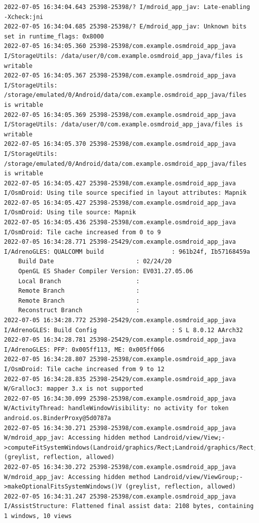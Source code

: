 \documentclass[a4paper,12pt]{book}
\begin{document}
\begin{lstlisting}
2022-07-05 16:34:04.643 25398-25398/? I/mdroid_app_jav: Late-enabling -Xcheck:jni
2022-07-05 16:34:04.685 25398-25398/? E/mdroid_app_jav: Unknown bits set in runtime_flags: 0x8000
2022-07-05 16:34:05.360 25398-25398/com.example.osmdroid_app_java I/StorageUtils: /data/user/0/com.example.osmdroid_app_java/files is writable
2022-07-05 16:34:05.367 25398-25398/com.example.osmdroid_app_java I/StorageUtils: /storage/emulated/0/Android/data/com.example.osmdroid_app_java/files is writable
2022-07-05 16:34:05.369 25398-25398/com.example.osmdroid_app_java I/StorageUtils: /data/user/0/com.example.osmdroid_app_java/files is writable
2022-07-05 16:34:05.370 25398-25398/com.example.osmdroid_app_java I/StorageUtils: /storage/emulated/0/Android/data/com.example.osmdroid_app_java/files is writable
2022-07-05 16:34:05.427 25398-25398/com.example.osmdroid_app_java I/OsmDroid: Using tile source specified in layout attributes: Mapnik
2022-07-05 16:34:05.427 25398-25398/com.example.osmdroid_app_java I/OsmDroid: Using tile source: Mapnik
2022-07-05 16:34:05.436 25398-25398/com.example.osmdroid_app_java I/OsmDroid: Tile cache increased from 0 to 9
2022-07-05 16:34:28.771 25398-25429/com.example.osmdroid_app_java I/AdrenoGLES: QUALCOMM build                   : 961b24f, Ib57168459a
    Build Date                       : 02/24/20
    OpenGL ES Shader Compiler Version: EV031.27.05.06
    Local Branch                     : 
    Remote Branch                    : 
    Remote Branch                    : 
    Reconstruct Branch               : 
2022-07-05 16:34:28.772 25398-25429/com.example.osmdroid_app_java I/AdrenoGLES: Build Config                     : S L 8.0.12 AArch32
2022-07-05 16:34:28.781 25398-25429/com.example.osmdroid_app_java I/AdrenoGLES: PFP: 0x005ff113, ME: 0x005ff066
2022-07-05 16:34:28.807 25398-25398/com.example.osmdroid_app_java I/OsmDroid: Tile cache increased from 9 to 12
2022-07-05 16:34:28.835 25398-25429/com.example.osmdroid_app_java W/Gralloc3: mapper 3.x is not supported
2022-07-05 16:34:30.099 25398-25398/com.example.osmdroid_app_java W/ActivityThread: handleWindowVisibility: no activity for token android.os.BinderProxy@5d0787a
2022-07-05 16:34:30.271 25398-25398/com.example.osmdroid_app_java W/mdroid_app_jav: Accessing hidden method Landroid/view/View;->computeFitSystemWindows(Landroid/graphics/Rect;Landroid/graphics/Rect;)Z (greylist, reflection, allowed)
2022-07-05 16:34:30.272 25398-25398/com.example.osmdroid_app_java W/mdroid_app_jav: Accessing hidden method Landroid/view/ViewGroup;->makeOptionalFitsSystemWindows()V (greylist, reflection, allowed)
2022-07-05 16:34:31.247 25398-25398/com.example.osmdroid_app_java I/AssistStructure: Flattened final assist data: 2108 bytes, containing 1 windows, 10 views
\end{lstlisting}
\end{document}
